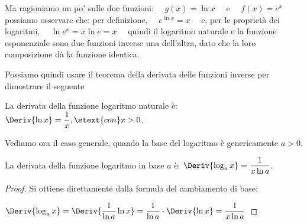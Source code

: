 Ma ragioniamo un po' sulle due funzioni:~~ \(g(x)=\ln x\)~~ e~~ \(f(x)=e^x\)
possiamo osservare che:
per definizione,~~ \(e^{\ln x} = x\)~~ e, per le proprietà dei logaritmi,~~ 
\(\ln e^x = x \ln e = x\)~~ quindi il logaritmo naturale e la funzione 
esponenziale sono due funzioni inverse una dell'altra, dato che la loro 
composizione dà la funzione identica.

Possiamo quindi usare il teorema della derivata delle funzioni inverse per 
dimostrare il seguente
\begin{teorema}
La derivata della funzione logaritmo naturale è: 
\(\Deriv{\ln x} = \dfrac{1}{x}, \stext{con} x>0\).
\end{teorema}

\label{}

Vediamo ora il caso generale, quando la base del logaritmo è genericamente 
\(a>0\).
\begin{teorema}
La derivata della funzione logaritmo in base \(a\) è: \qquad
\(\Deriv{\log_a x}= \dfrac{1}{x\ln a}\).
\end{teorema}
\begin{proof}
Si ottiene direttamente dalla formula del cambiamento di base:

\hspace{20mm}
\(\Deriv{\log_a x} = \Deriv{\dfrac{1}{\ln a}\ln x} = 
  \dfrac{1}{\ln a} \cdot \Deriv{\ln x} = \dfrac{1}{x \ln a}\)
\end{proof}

